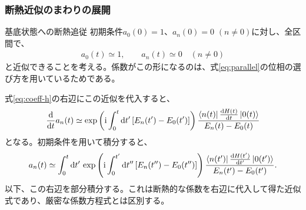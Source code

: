 \documentclass[a4paper,10.5pt]{article}
\numberwithin{equation}{section}
\providecommand{\ii}{\mathrm{i}}
\begin{document}
\subsubsection{断熱近似のまわりの展開}
\begin{defbox}{基底状態への断熱追従}
初期条件$a_0(0)=1$、$a_n(0)=0$ $(n\neq0)$に対し、全区間で、
\begin{align}
a_0(t)\simeq1,\qquad a_n(t)\simeq0\quad(n\neq0)
\end{align}
と近似できることを考える。係数がこの形になるのは、式\eqref{eq:parallel}の位相の選び方を用いているためである。
\end{defbox}
式\eqref{eq:coeff-h}の右辺にこの近似を代入すると、
\begin{align}
\frac{\dd}{\dd t}a_n(t)
\simeq
\exp\left(\ii\int_0^t\dd t'\,[E_n(t')-E_0(t')]\right)
\frac{\bra{n(t)}\frac{\dd H(t)}{\dd t}\ket{0(t)}}
{E_n(t)-E_0(t)}
\end{align}
となる。初期条件を用いて積分すると、
\begin{align}
a_n(t)\simeq
\int_0^t\dd t'\,
\exp\left(\ii\int_0^{t'}\dd t''\,[E_n(t'')-E_0(t'')]\right)
\frac{\bra{n(t')}\frac{\dd H(t')}{\dd t'}\ket{0(t')}}{E_n(t')-E_0(t')}.
\label{eq:first-transition}
\end{align}
以下、この右辺を部分積分する。これは断熱的な係数を右辺に代入して得た近似式であり、厳密な係数方程式とは区別する。
\end{document}

